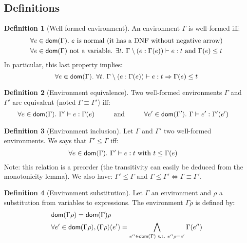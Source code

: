 \documentclass[a4paper]{article}
\theoremstyle{definition}
\newtheorem{definition}{Definition}
\begin{document}
      \subsection{Definitions}
      
      \begin{definition}[Well formed environment]
        An environment $\Gamma$ is well-formed iff:
        \begin{align*}
          &\forall e \in \textsf{dom}(\Gamma).\ e \text{ is normal (it has a DNF without negative arrow)}\\
          &\forall e \in \textsf{dom}(\Gamma) \text{ not a variable. } \exists t.\ \Gamma\setminus(e:\Gamma(e)) \vdash e : t \text{ and } \Gamma(e) \leq t
        \end{align*}
        In particular, this last property implies:
        \[
          \forall e \in \dom \Gamma.\ \forall t.\ \Gamma\setminus(e:\Gamma(e)) \vdash e : t \Rightarrow \Gamma(e) \leq t
        \]
      \end{definition}

      \begin{definition}[Environment equivalence]
        Two well-formed environments $\Gamma$ and $\Gamma'$ are equivalent (noted $\Gamma \equiv \Gamma'$) iff:
        \begin{align*} 
          &\forall e \in \textsf{dom}(\Gamma).\ \Gamma' \vdash e:\Gamma(e) \hspace{1cm} \text{and} \hspace{1cm}
          \forall e' \in \textsf{dom}(\Gamma').\ \Gamma \vdash e':\Gamma'(e')
        \end{align*}
      \end{definition}
    
      \begin{definition}[Environment inclusion]
        Let $\Gamma$ and $\Gamma'$ two well-formed environments. We says that $\Gamma' \leq \Gamma$ iff:
        \begin{align*}
          &\forall e \in \textsf{dom}(\Gamma).\ \Gamma' \vdash e : t \text{ with } t \leq \Gamma(e)
        \end{align*}
        Note: this relation is a preorder (the transitivity can easily be deduced from the monotonicity lemma).
        We also have: $\Gamma' \leq \Gamma \text{ and } \Gamma \leq \Gamma' \Leftrightarrow \Gamma \equiv \Gamma'$.
      \end{definition}
    
      \begin{definition}[Environment substitution]
        Let $\Gamma$ an environment and $\rho$ a substitution from variables to expressions.
        The environment $\Gamma\rho$ is defined by:
        \begin{align*}
          &\textsf{dom}(\Gamma\rho) = \textsf{dom}(\Gamma) \rho\\
          &\forall e' \in \textsf{dom}(\Gamma\rho), (\Gamma\rho)(e') = \bigwedge_{e'' \in \textsf{dom}(\Gamma) \text{ s.t. } e''\rho=e'}\Gamma(e'')
        \end{align*}
      \end{definition}
    
\end{document}
